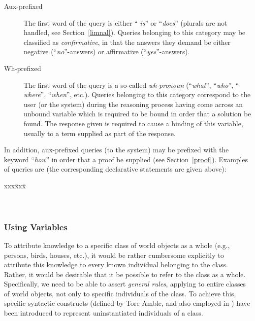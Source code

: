 \begin{description}
  \item[Aux-prefixed] The first word of the query is either ``{\em
    is\/}'' or ``{\em does\/}'' (plurals are not handled, see
    Section~\ref{limnal}). Queries belonging to this category may be 
    classified as {\em confirmative\/}, in that the answers they
    demand be either negative (``{\em no\/}''-answers) or affirmative
    (``{\em yes\/}''-answers).
  \item[Wh-prefixed] The first word of the query is a so-called
    {\em wh-pronoun\/} (``{\em what\/}'', ``{\em who\/}'', ``{\em
    where\/}'', ``{\em when\/}'', etc.). Queries belonging to this
    category correspond to the user (or the system) during the
    reasoning process having come across an unbound variable which
    is required to be bound in order that a solution be found. The
    response given is required to cause a binding of this variable,
    usually to a term supplied as part of the response.
\end{description}
In addition, aux-prefixed queries (to the system) may be prefixed with
the keyword ``{\em how\/}'' in order that a proof be supplied (see
Section~\ref{proof}).  Examples of queries are (the corresponding
declarative statements are given above):

\begin{tabbing}
  xxx\= xxx\= \kill
  \>\\
  \>\\
  \>\\
  \>
\end{tabbing}

\subsubsection{Using Variables}

To attribute knowledge to a specific class of world objects as a whole
(e.g., persons, birds, houses, etc.), it would be rather cumbersome
explicitly to attribute this knowledge to every known individual
belonging to the class. Rather, it would be desirable that it be
possible to refer to the class as a whole. Specifically, we need to be
able to assert {\em general rules\/}, applying to entire classes of
world objects, not only to specific individuals of the class. To
achieve this, specific syntactic constructs (defined by Tore Amble,
and also employed in {\tuc}) have been introduced to represent
uninstantiated individuals of a class. 

